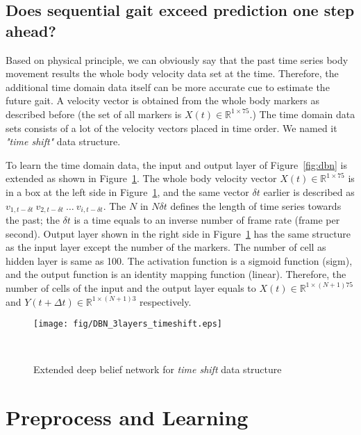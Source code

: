 \documentclass{sigchi}
\begin{document}
\subsection{Does sequential gait exceed prediction one step ahead?}

Based on physical principle, we can obviously say that the past time series body movement results the whole body velocity data set at the time. Therefore, the additional time domain data itself can be more accurate cue to estimate the future gait. A velocity vector is obtained from the whole body markers as described before (the set of all markers is $X(t)\in\mathbb{R}^{1 \times 75} $.) The time domain data sets consists of a lot of the velocity vectors placed in time order. We named it \textit{ "time shift"} data structure. 

To learn the time domain data, the input and output layer of Figure~\ref{fig:dbn} is extended as shown in Figure~\ref{fig:dbn_timeshift}. The whole body velocity vector $X(t)\in\mathbb{R}^{1 \times 75} $ is in a box at the left side in Figure~\ref{fig:dbn_timeshift}, and the same vector $\delta t$ earlier is described as $v_{1,t-\delta t} \ v_{2,t-\delta t} \ \dots \ v_{i, t-\delta t}$. The $N$ in $ N \delta t $ defines the length of time series towards the past; the $\delta t$ is a time equals to an inverse number of frame rate (frame per second). Output layer shown in the right side in Figure~\ref{fig:dbn_timeshift} has the same structure as the input layer except the number of the markers. The number of cell as hidden layer is same as 100. The activation function is a sigmoid function (sigm), and the output function is an identity mapping function (linear). Therefore, the number of cells of the input and the output  layer equals to $ X (t) \in \mathbb {R}^{1 \times (N+1)75} $ and $ Y (t + \Delta t) \in \mathbb {R} ^{1 \times (N+1)3}$ respectively. 


\begin{figure}
\centering
  \texttt{[image: fig/DBN\_3layers\_timeshift.eps]}
  \caption{Extended deep belief network for \textit{time shift} data structure}~\label{fig:dbn_timeshift}
\end{figure}

\section{Preprocess and Learning}

\end{document}
